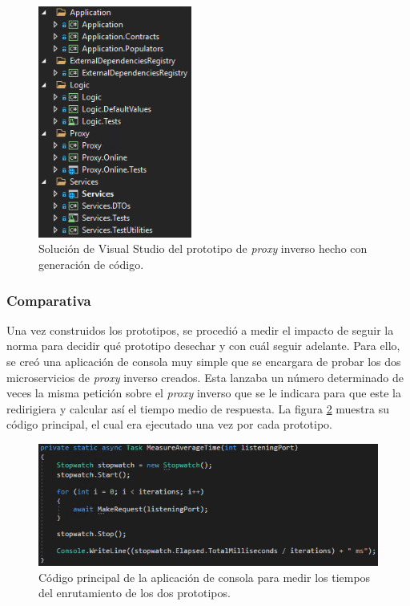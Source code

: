 \documentclass[11pt,spanish,listoffigures]{tfgetsinf}
\begin{document}
\begin{figure}[ht]
\centering
\includegraphics[width=0.45\textwidth]{imagenes/prototipoAutogenerado}
\caption{Solución de Visual Studio del prototipo de \emph{proxy} inverso hecho con generación de código.}
	\label{prototipoAutogenerado}
\end{figure}


			\subsubsection{Comparativa}

Una vez construidos los prototipos, se procedió a medir el impacto de seguir la norma para decidir qué prototipo desechar y con cuál seguir adelante. Para ello, se creó una aplicación de consola muy simple que se encargara de probar los dos microservicios de \emph{proxy} inverso creados. Esta lanzaba un número determinado de veces la misma petición sobre el \emph{proxy} inverso que se le indicara para que este la redirigiera y calcular así el tiempo medio de respuesta. La figura \ref{medidorTiempos} muestra su código principal, el cual era ejecutado una vez por cada prototipo.

\begin{figure}[ht]
\centering
\includegraphics[scale=1]{imagenes/medidorTiempos}
\caption{Código principal de la aplicación de consola para medir los tiempos del enrutamiento de los dos prototipos.}
	\label{medidorTiempos}
\end{figure}
\end{document}

